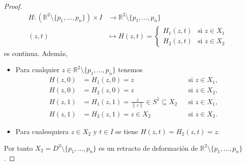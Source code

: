 \begin{proof}
\begin{align*}
H:(\mathbb{R}^2\setminus\{p_1,\dots,p_n\})\times I&\longrightarrow\mathbb{R}^2\setminus\{p_1,\dots,p_n\}\\
(z,t)&\longmapsto H(z,t)=
\begin{cases}
H_1(z,t) & \text{si } z\in X_1\\
H_2(z,t) & \text{si } z\in X_2
\end{cases}
\end{align*}
es continua. Además,
\begin{itemize}
\item Para cualquier $z\in\mathbb{R}^2\setminus\{p_1,\dots,p_n\}$ tenemos
\begin{align*}
H(z,0)&=H_1(z,0)=z &&\text{si } z\in X_1,\\
H(z,0)&=H_2(z,0)=z &&\text{si } z\in X_2,\\
H(z,1)&=H_1(z,1)=\frac{z}{\lVert z\rVert}\in S^1\subseteq X_2 &&\text{si } z\in X_1,\\
H(z,1)&=H_2(z,1)=z\in X_2 &&\text{si } z\in X_2.
\end{align*}
\item Para cualesquiera $z\in X_2$ y $t\in I$ se tiene $H(z,t)=H_2(z,t)=z$.
\end{itemize}
Por tanto $X_2=D^2\setminus\{p_1,\dots,p_n\}$ es un retracto de deformación de $\mathbb{R}^2\setminus\{p_1,\dots,p_n\}$.
\end{proof}

